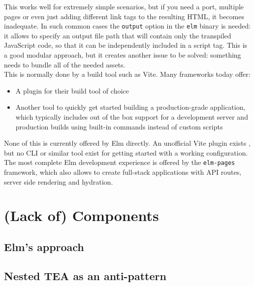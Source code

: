 This works well for extremely simple scenarios, but if you need a port, multiple pages or even just adding different link tags to the resulting HTML, it becomes inadequate. In such common cases the \texttt{output} option in the \texttt{elm} binary is needed: it allows to specify an output file path that will contain only the transpiled JavaScript code, so that it can be independently included in a script tag. This is a good modular approach, but it creates another issue to be solved: something needs to bundle all of the needed assets.\\

This is normally done by a build tool such as Vite. Many frameworks today offer:
\begin{itemize}
    \item A plugin for their build tool of choice
    \item Another tool to quickly get started building a production-grade application, which typically includes out of the box support for a development server and production builds using built-in commands instead of custom scripts
\end{itemize}
None of this is currently offered by Elm directly. An unofficial Vite plugin exists \cite{hamasaki_hmskvite-plugin-elm_2024}, but no CLI or similar tool exist for getting started with a working configuration.\\

The most complete Elm development experience is offered by the \texttt{elm-pages} framework, which also allows to create full-stack applications with API routes, server side rendering and hydration. \cite{noauthor_what_nodate}

\section{(Lack of) Components}
\subsection{Elm's approach}
\subsection{Nested TEA as an anti-pattern}
